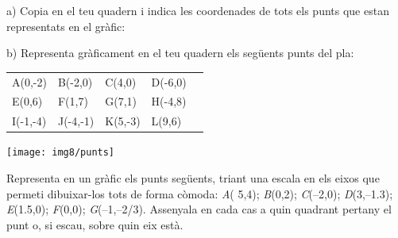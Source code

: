 
\begin{mylist}

 

\vspace{-3cm}
\exer  \begin{minipage}[t]{0.5\textwidth} a) Copia en el teu quadern i indica les coordenades de tots els punts que estan representats en el gràfic: 

 b) Representa gràficament en el teu quadern els següents punts del pla: 

\begin{tabular}{lllll}
 A(0,-2) &  B(-2,0) & C(4,0) & D(-6,0) \\
 E(0,6) & F(1,7) & G(7,1) & H(-4,8) \\
  I(-1,-4) & J(-4,-1) &  K(5,-3) &  L(9,6) \\
\end{tabular}

\end{minipage}
\begin{minipage}{0.5\textwidth}
	\vspace{3cm}
 \texttt{[image: img8/punts]}
\end{minipage} 



\exer   Representa en un gràfic els punts següents, triant una escala en els eixos que permeti dibuixar-los tots de forma còmoda: \textit{A}( 5,4); \textit{B}(0,2); \textit{C}(--2,0); \textit{D}(3,--1.3); \textit{E}(1.5,0); \textit{F}(0,0); \textit{G}(--1,--2/3). Assenyala en cada cas a quin quadrant pertany el punt o, si escau, sobre quin eix està.


\end{mylist}
